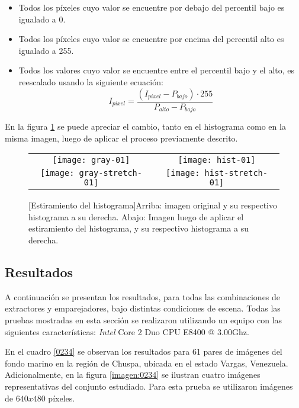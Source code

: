 \begin{itemize}
	\item Todos los píxeles cuyo valor se encuentre por debajo del percentil bajo es igualado a 0.
	\item Todos los píxeles cuyo valor se encuentre por encima del percentil alto es igualado a 255.
	\item Todos los valores cuyo valor se encuentre entre el percentil bajo y el alto, es reescalado usando la siguiente ecuación: 
	\begin{displaymath}
		I_{pixel} = \frac{(I_{pixel} - P_{bajo}) \cdot 255}{P_{alto} - P_{bajo}}
	\end{displaymath}
\end{itemize}

En la figura \ref{imagen:stretch} se puede apreciar el cambio, tanto en el histograma como en la misma imagen, luego de aplicar el proceso previamente descrito.


\begin{figure}[h]
	\centering
	\vspace{0.6cm}
	\begin{tabular}{@{}cc@{}}
		\texttt{[image: gray-01]} &
		\texttt{[image: hist-01]} \\
		\texttt{[image: gray-stretch-01]} &
		\texttt{[image: hist-stretch-01]}
	\end{tabular}
	[Estiramiento del histograma]{Arriba: imagen original y su respectivo histograma a su derecha. Abajo: Imagen luego de aplicar el estiramiento del histograma, y su respectivo histograma a su derecha.}
	\label{imagen:stretch}
\end{figure}


\subsection{Resultados}

A continuación se presentan los resultados, para todas las combinaciones de extractores y emparejadores, bajo distintas condiciones de escena. Todas las pruebas mostradas en esta sección se realizaron utilizando un equipo con las siguientes características:  \textit{Intel\textsuperscript \textregistered } Core 2 Duo CPU E8400 @ 3.00Ghz.

En el cuadro \ref{0234} se observan los resultados para 61 pares de imágenes del fondo marino en la región de Chuspa, ubicada en el estado Vargas, Venezuela. Adicionalmente, en la figura \ref{imagen:0234} se ilustran cuatro imágenes representativas del conjunto estudiado. Para esta prueba se utilizaron imágenes de $640x480$ píxeles.

